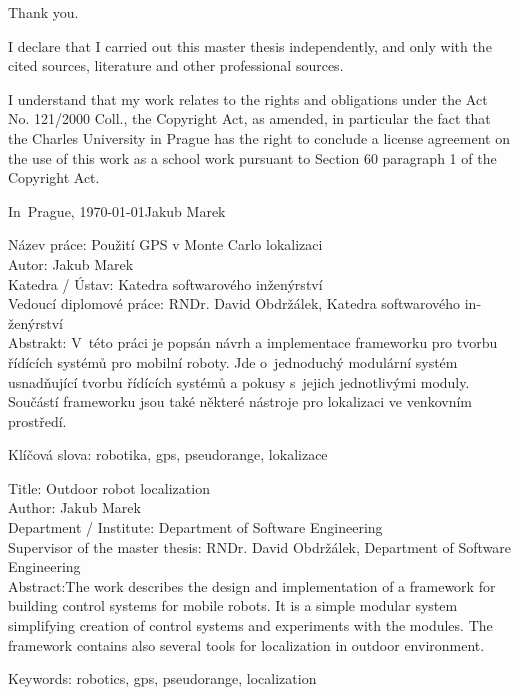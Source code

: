 \pagestyle{empty}

\vspace{10mm} 

\noindent Thank you.
\newpage

\vspace*{\fill}
I declare that I carried out this master thesis independently, and only with the cited
sources, literature and other professional sources.

I understand that my work relates to the rights and obligations under the Act No.
121/2000 Coll., the Copyright Act, as amended, in particular the fact that the Charles
University in Prague has the right to conclude a license agreement on the use of this
work as a school work pursuant to Section 60 paragraph 1 of the Copyright Act.

\vspace{10mm} 
\noindent In~Prague, \today\hspace{\fill}Jakub Marek\\
\newpage

\tableofcontents*
\newpage

\begin{otherlanguage}{czech}
\noindent
Název práce: Použití GPS v Monte Carlo lokalizaci\\
Autor: Jakub Marek\\
Katedra / Ústav: Katedra softwarového inženýrství\\
Vedoucí diplomové práce: RNDr. David Obdržálek, Katedra softwarového inženýrství\\

\noindent Abstrakt: V~této práci je popsán návrh a implementace
frameworku pro tvorbu řídících systémů pro mobilní roboty.
Jde o~jednoduchý modulární systém
usnadňující tvorbu řídících systémů a pokusy s~jejich jednotlivými moduly.
Součástí frameworku jsou také některé nástroje pro lokalizaci ve venkovním prostředí.

\noindent Klíčová slova: robotika, gps, pseudorange, lokalizace
\end{otherlanguage}

\vspace{25mm}

\noindent
Title: Outdoor robot localization\\
Author: Jakub Marek\\
Department / Institute: Department of Software Engineering\\
Supervisor of the master thesis: RNDr. David Obdržálek, Department of Software Engineering\\

\noindent Abstract:The work describes the design and implementation
of a framework for building control systems for mobile robots.
It is a simple modular system simplifying creation of control systems and experiments with the modules.
The framework contains also several tools for localization in outdoor environment.

\noindent Keywords: robotics, gps, pseudorange, localization


\newpage

\pagestyle{plain}
\setcounter{page}{1}
